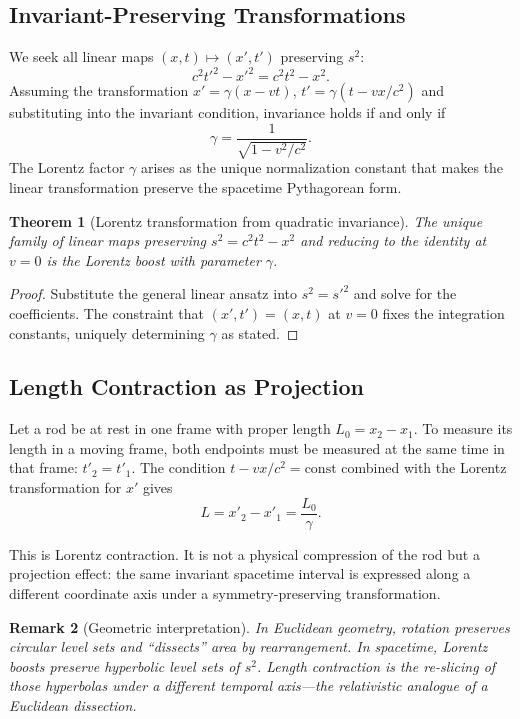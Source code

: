 \documentclass[12pt]{article}
\newtheorem{theorem}{Theorem}[section]
\newtheorem{remark}[theorem]{Remark}
\begin{document}
\subsection{Invariant-Preserving Transformations}

We seek all linear maps $(x,t) \mapsto (x',t')$ preserving $s^2$:
\[
  c^2 t'^2 - x'^2 = c^2 t^2 - x^2.
\]
Assuming the transformation $x' = \gamma(x - vt)$,
$t' = \gamma(t - vx/c^2)$ and substituting into the invariant condition,
invariance holds if and only if
\[
  \gamma = \frac{1}{\sqrt{1 - v^2/c^2}}.
\]
The Lorentz factor $\gamma$ arises as the unique normalization constant
that makes the linear transformation preserve the spacetime Pythagorean form.

\begin{theorem}[Lorentz transformation from quadratic invariance]
\label{thm:lorentz}
The unique family of linear maps preserving $s^2 = c^2t^2 - x^2$ and
reducing to the identity at $v = 0$ is the Lorentz boost with parameter $\gamma$.
\end{theorem}

\begin{proof}
Substitute the general linear ansatz into $s^2 = s'^2$ and solve for the
coefficients. The constraint that $(x',t') = (x,t)$ at $v=0$ fixes the
integration constants, uniquely determining $\gamma$ as stated.
\end{proof}

\subsection{Length Contraction as Projection}

Let a rod be at rest in one frame with proper length $L_0 = x_2 - x_1$.
To measure its length in a moving frame, both endpoints must be measured at
the same time in that frame: $t'_2 = t'_1$. The condition
$t - vx/c^2 = \mathrm{const}$ combined with the Lorentz transformation for
$x'$ gives
\[
  L = x'_2 - x'_1 = \frac{L_0}{\gamma}.
\]

This is Lorentz contraction. It is not a physical compression of the rod
but a projection effect: the same invariant spacetime interval is expressed
along a different coordinate axis under a symmetry-preserving transformation.

\begin{remark}[Geometric interpretation]
In Euclidean geometry, rotation preserves circular level sets and ``dissects''
area by rearrangement. In spacetime, Lorentz boosts preserve hyperbolic level
sets of $s^2$. Length contraction is the re-slicing of those hyperbolas under
a different temporal axis---the relativistic analogue of a Euclidean dissection.
\end{remark}
\end{document}
